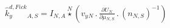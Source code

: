 \documentclass[border=2pt]{standalone}
\begin{document}
${{\hat{k}^{d,Fick}_y}}{_{A, S}}={{I}}{_{N, A}} \stackrel{N}{\star} \left({{v_y}}{_{N}} \, . \, \frac{\partial{{U}{_{N}}}}{\partial{{{\mu}}{_{N, S}}}} \, . \, \left( {n}{_{N, S}} \right)^{-1}\right)$
\end{document}
